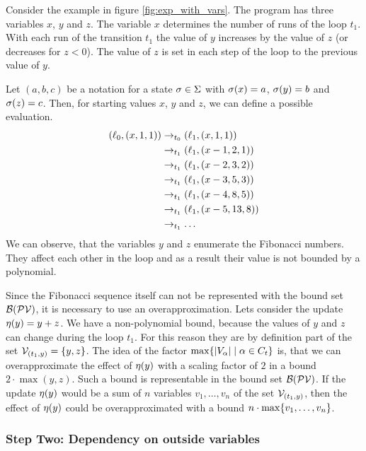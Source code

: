 

Consider the example in figure \ref{fig:exp_with_vars}.
The program has three variables $x$, $y$ and $z$.
The variable $x$ determines the number of runs of the loop $t_1$.
With each run of the transition $t_1$ the value of $y$ increases by the value of $z$ (or decreases for $z < 0$).
The value of $z$ is set in each step of the loop to the previous value of $y$.

Let $(a,b,c)$ be a notation for a state $\sigma \in \Sigma$ with $\sigma(x) = a$, $\sigma(y) = b$ and $\sigma(z) = c$.
Then, for starting values $x$, $y$ and $z$, we can define a possible evaluation.
\begin{align*}
  (\ell_0, (x,1,1)) & \rightarrow_{t_0} (\ell_1, (x,1,1)) \\
  & \rightarrow_{t_1} (\ell_1, (x-1,2,1)) \\
  & \rightarrow_{t_1} (\ell_1, (x-2,3,2)) \\
  & \rightarrow_{t_1} (\ell_1, (x-3,5,3)) \\
  & \rightarrow_{t_1} (\ell_1, (x-4,8,5)) \\
  & \rightarrow_{t_1} (\ell_1, (x-5,13,8)) \\
  & \rightarrow_{t_1} \dots
\end{align*}
We can observe, that the variables $y$ and $z$ enumerate the Fibonacci numbers.
They affect each other in the loop and as a result their value is not bounded by a polynomial.

Since the Fibonacci sequence itself can not be represented with the bound set $\mathcal{B}(\mathcal{PV})$, it is necessary to use an overapproximation.
Lets consider the update $\eta(y) = y + z$.
We have a non-polynomial bound, because the values of $y$ and $z$ can change during the loop $t_1$.
For this reason they are by definition part of the set $\mathcal{V}_{(t_1,y)} = \lbrace y,z \rbrace$.
The idea of the factor $\max \lbrace \left|V_\alpha\right| \mid \alpha \in C_t \rbrace$ is, that we can overapproximate the effect of $\eta(y)$ with a scaling factor of $2$ in a bound $2 \cdot \max(y,z)$.
Such a bound is representable in the bound set $\mathcal{B}(\mathcal{PV})$.
If the update $\eta(y)$ would be a sum of $n$ variables $v_1, \dots, v_n$ of the set $\mathcal{V}_{(t_1,y)}$, then the effect of $\eta(y)$ could be overapproximated with a bound $n \cdot \max \lbrace v_1, \dots, v_n \rbrace$.

\subsubsection{Step Two: Dependency on outside variables}

